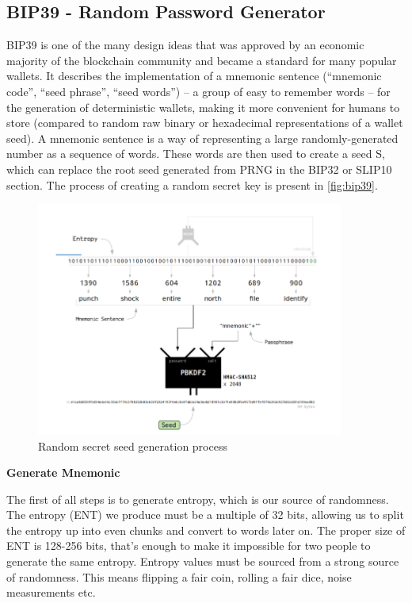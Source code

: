 \subsection{BIP39 - Random Password Generator}
\label{bip39}
BIP39 is one of the many design ideas that was approved by an economic majority of the blockchain community and became a standard for many popular wallets. It describes the implementation of a mnemonic sentence (“mnemonic code”, “seed phrase”, “seed words”) -- a group of easy to remember words -- for the generation of deterministic wallets, making it more convenient for humans to store (compared to random raw binary or hexadecimal representations of a wallet seed). A mnemonic sentence is a way of representing a large randomly-generated number as a sequence of words. These words are then used to create a seed S, which can replace the root seed generated from PRNG in the BIP32 or SLIP10 section. The process of creating a random secret key is present in \autoref{fig:bip39}.

\begin{figure}[ht!]
    \centering
    \includegraphics[width=0.9\textwidth]{images/bip39.png}
    \caption[Random secret seed generation process]{Random secret seed generation process}
    \label{fig:bip39}
\end{figure}

\bigskip
{\textbf{Generate Mnemonic}}

The first of all steps is to generate entropy, which is our source of randomness. The entropy (ENT) we produce must be a multiple of 32 bits, allowing us to split the entropy up into even chunks and convert to words later on.
The proper size of ENT is 128-256 bits, that’s enough to make it impossible for two people to generate the same entropy.
Entropy values must be sourced from a strong source of randomness. This means flipping a fair coin, rolling a fair dice, noise measurements etc.


